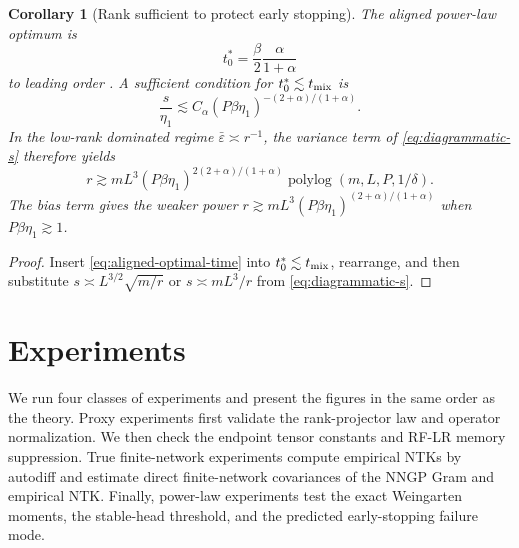 \documentclass{article}
\newtheorem{corollary}[theorem]{Corollary}
\newcommand{\barE}{\bar\varepsilon}
\begin{document}
\begin{corollary}[Rank sufficient to protect early stopping]
\label{cor:early-stopping-rank}
The aligned power-law optimum is
\begin{equation}
t_0^*=\frac{\beta}{2}\frac{\alpha}{1+\alpha}
\label{eq:aligned-optimal-time}
\end{equation}
to leading order \citep{KrampLindnerHelias2026}.  A sufficient condition for \(t_0^*\lesssim t_{\rm mix}\) is
\begin{equation}
\frac{s}{\eta_1}\lesssim C_\alpha
(P\beta\eta_1)^{-(2+\alpha)/(1+\alpha)}.
\label{eq:early-stop-s-condition}
\end{equation}
In the low-rank dominated regime \(\barE\asymp r^{-1}\), the variance term of \eqref{eq:diagrammatic-s} therefore yields
\begin{equation}
r\gtrsim
mL^3(P\beta\eta_1)^{2(2+\alpha)/(1+\alpha)}
\operatorname{polylog}(m,L,P,1/\delta).
\label{eq:powerlaw-rank-law}
\end{equation}
The bias term gives the weaker power
\(r\gtrsim mL^3(P\beta\eta_1)^{(2+\alpha)/(1+\alpha)}\) when \(P\beta\eta_1\gtrsim1\).
\end{corollary}

\begin{proof}
Insert \eqref{eq:aligned-optimal-time} into \(t_0^*\lesssim t_{\rm mix}\), rearrange, and then substitute \(s\asymp L^{3/2}\sqrt{m/r}\) or \(s\asymp mL^3/r\) from \eqref{eq:diagrammatic-s}.
\end{proof}

\section{Experiments}
We run four classes of experiments and present the figures in the same order as the theory. Proxy experiments first validate the rank-projector law and operator normalization. We then check the endpoint tensor constants and RF-LR memory suppression. True finite-network experiments compute empirical NTKs by autodiff and estimate direct finite-network covariances of the NNGP Gram and empirical NTK.  Finally, power-law experiments test the exact Weingarten moments, the stable-head threshold, and the predicted early-stopping failure mode.
\end{document}
